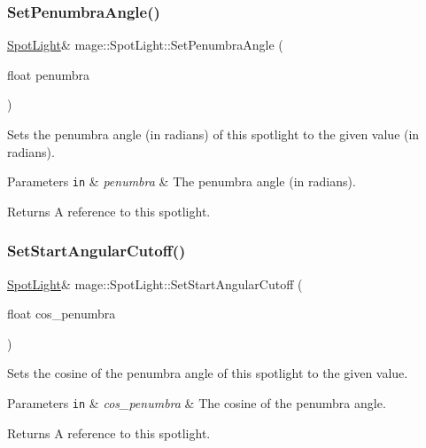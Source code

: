 \subsubsection{\texorpdfstring{Set\+Penumbra\+Angle()}{SetPenumbraAngle()}}
{\footnotesize\ttfamily \hyperlink{classmage_1_1_spot_light}{Spot\+Light}\& mage\+::\+Spot\+Light\+::\+Set\+Penumbra\+Angle (\begin{DoxyParamCaption}\item[{float}]{penumbra }\end{DoxyParamCaption})\hspace{0.3cm}{\ttfamily [noexcept]}}

Sets the penumbra angle (in radians) of this spotlight to the given value (in radians).


\begin{DoxyParams}[1]{Parameters}
\mbox{\tt in}  & {\em penumbra} & The penumbra angle (in radians). \\
\hline
\end{DoxyParams}
\begin{DoxyReturn}{Returns}
A reference to this spotlight. 
\end{DoxyReturn}
\hypertarget{classmage_1_1_spot_light_a3129a3c330cf63066497af087f97476b}{}\label{classmage_1_1_spot_light_a3129a3c330cf63066497af087f97476b} 
\subsubsection{\texorpdfstring{Set\+Start\+Angular\+Cutoff()}{SetStartAngularCutoff()}}
{\footnotesize\ttfamily \hyperlink{classmage_1_1_spot_light}{Spot\+Light}\& mage\+::\+Spot\+Light\+::\+Set\+Start\+Angular\+Cutoff (\begin{DoxyParamCaption}\item[{float}]{cos\+\_\+penumbra }\end{DoxyParamCaption})\hspace{0.3cm}{\ttfamily [noexcept]}}

Sets the cosine of the penumbra angle of this spotlight to the given value.


\begin{DoxyParams}[1]{Parameters}
\mbox{\tt in}  & {\em cos\+\_\+penumbra} & The cosine of the penumbra angle. \\
\hline
\end{DoxyParams}
\begin{DoxyReturn}{Returns}
A reference to this spotlight. 
\end{DoxyReturn}
\hypertarget{classmage_1_1_spot_light_ab9a64591f25e408f5928a25ebbce7e69}{}\label{classmage_1_1_spot_light_ab9a64591f25e408f5928a25ebbce7e69} 
